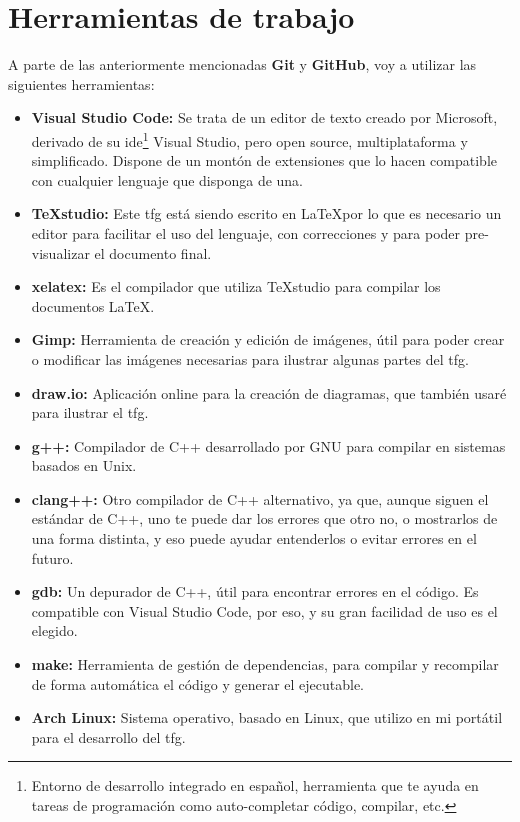 \section{Herramientas de trabajo}
\label{herramientas}
A parte de las anteriormente mencionadas \textbf{Git} y \textbf{GitHub}, voy a utilizar las siguientes herramientas:
\begin{itemize}
    \item \textbf{Visual Studio Code:} Se trata de un editor de texto creado por Microsoft, derivado de su \gls{ide}\footnote{Entorno de desarrollo integrado en español, herramienta que te ayuda en tareas de programación como auto-completar código, compilar, etc.} Visual Studio, pero open source, multiplataforma y simplificado. Dispone de un montón de extensiones que lo hacen compatible con cualquier lenguaje que disponga de una.
    \item \textbf{TeXstudio:} Este \gls{tfg} está siendo escrito en \LaTeX por lo que es necesario un editor para facilitar el uso del lenguaje, con correcciones y para poder pre-visualizar el documento final.
    \item \textbf{xelatex:} Es el compilador que utiliza TeXstudio para compilar los documentos \LaTeX.
    \item \textbf{Gimp:} Herramienta de creación y edición de imágenes, útil para poder crear o modificar las imágenes necesarias para ilustrar algunas partes del \gls{tfg}.
    \item \textbf{draw.io:} Aplicación online para la creación de diagramas, que también usaré para ilustrar el \gls{tfg}.
    \item \textbf{g++:} Compilador de C++ desarrollado por GNU para compilar en sistemas basados en Unix.
    \item \textbf{clang++:} Otro compilador de C++ alternativo, ya que, aunque siguen el estándar de C++, uno te puede dar los errores que otro no, o mostrarlos de una forma distinta, y eso puede ayudar entenderlos o evitar errores en el futuro.
    \item \textbf{gdb:} Un depurador de C++, útil para encontrar errores en el código. Es compatible con Visual Studio Code, por eso, y su gran facilidad de uso es el elegido. 
    \item \textbf{make:} Herramienta de gestión de dependencias, para compilar y recompilar de forma automática el código y generar el ejecutable.
    \item \textbf{Arch Linux:} Sistema operativo, basado en Linux, que utilizo en mi portátil para el desarrollo del \gls{tfg}.
\end{itemize}